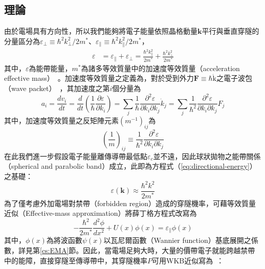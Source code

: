 \subsection{理論}
由於電場具有方向性，所以我們能夠將電子能量依照晶格動量$\mathbf{k}$平行與垂直穿隧的分量區分為$\varepsilon_\perp\equiv\hbar^2k^2_\perp/2m^*$、$\varepsilon_\parallel\equiv\hbar^2k_\parallel^2/2m^*$，
\begin{equation}
\begin{aligned}\label{eq:directional-energy}
\varepsilon&=\varepsilon_\parallel + \varepsilon_\perp=\frac{\hbar^2k_\parallel^2}{2m^*}+\frac{\hbar^2k_\perp^2}{2m^*}
\end{aligned}
\end{equation}
其中，$\varepsilon$為能帶能量，$m^*$為諸多等效質量中的加速度等效質量（acceleration effective mass）~\cite{jacoboni2012monte}。加速度等效質量之定義為，對於受到外力$\mathbf{F}\equiv\hbar\dot{\mathrm{k}}$之電子波包（wave packet）~\cite{AshcroftMermin1976ch12}，其加速度之第$i$個分量為
\begin{equation}
a_i=\frac{dv_i}{dt}=\frac{d}{dt}\left(\frac{1}{\hbar}\frac{\partial \varepsilon}{\partial k_i}\right)=\sum_j\frac{1}{\hbar}\frac{\partial^2\varepsilon}{\partial k_i\partial k_j}\dot{k}_j=\sum_j\frac{1}{\hbar^2}\frac{\partial^2\varepsilon}{\partial k_i\partial k_j}F_j\label{eq:acceleration}
\end{equation}
其中，加速度等效質量之反矩陣元素$(m^{-1})_{ij}$為
\begin{equation}
\left(\frac{1}{m}\right)_{ij}\equiv \frac{1}{\hbar^2}\frac{\partial^2\varepsilon}{\partial k_i\partial k_j}\label{eq:inverse-of-effective-mass}
\end{equation}
在此我們進一步假設電子能量離傳導帶最低點$\varepsilon_c$並不遠，因此球狀拋物之能帶關係（spherical and parabolic band）成立，此即為方程式（\ref{eq:directional-energy}）之基礎：
\begin{equation}
\varepsilon(\mathbf{k})\approx\frac{\hbar^2k^2}{2m^*}\label{eq:spherical-parabolic-band}
\end{equation}
為了僅考慮外加電場對禁帶（forbidden region）造成的穿隧機率，可藉等效質量近似（Effective-mass approximation）將薛丁格方程式改寫為
\begin{equation}
-\frac{\hbar^2}{2m^*}\frac{d^2\phi}{dx^2}+U(x)\phi(x)=\varepsilon_\parallel\phi(x)
\end{equation}
其中，$\phi(x)$為將波函數$\psi(x)$以瓦尼爾函數（Wannier function）基底展開之係數，詳見第\ref{cs:EMA}節。因此，當電場足夠大時，大量的價帶電子就能跨越禁帶中的能障，直接穿隧至傳導帶中，其穿隧機率$P$可用WKB近似寫為~\cite{PhysSMCMoll:forbiddenGap}：

